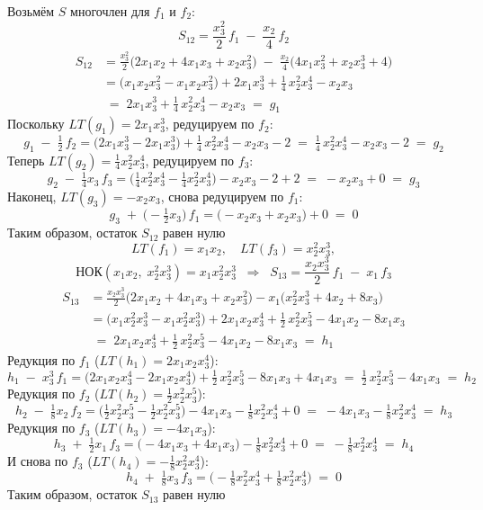 \documentclass[a4paper]{article}
\begin{document}
\begin{enumerate}
  Возьмём $S$ многочлен для $f_1$ и $f_2$:
  \[S_{12}
  =\frac{x_3^2}{2}\,f_1 \;-\;\frac{x_2}{4}\,f_2
  \]
  \[
  \begin{aligned}
  S_{12}
  &=\frac{x_3^2}{2}\bigl(2x_1x_2+4x_1x_3+x_2x_3^2\bigr)
  \;-\;\frac{x_2}{4}\bigl(4x_1x_3^2+x_2x_3^3+4\bigr)\\
  &=\bigl(x_1x_2x_3^2 - x_1x_2x_3^2\bigr)
  +2x_1x_3^3
  +\frac14\,x_2^2x_3^4
  - x_2x_3
  \\
  &\;=\;2x_1x_3^3 + \tfrac14\,x_2^2x_3^4 - x_2x_3
  \;=\;g_1
  \end{aligned}
  \]
  Поскольку \(LT(g_1)=2x_1x_3^3\), редуцируем по \(f_2\):
  \[
  g_1 \;-\;\tfrac12\,f_2
  =\bigl(2x_1x_3^3 -2x_1x_3^3\bigr)
  +\tfrac14\,x_2^2x_3^4
  - x_2x_3
  -2
  \;=\;\tfrac14\,x_2^2x_3^4 - x_2x_3 -2
  \;=\;g_2
  \]
  Теперь \(LT(g_2)=\tfrac14x_2^2x_3^4\), редуцируем по \(f_3\):
  \[
  g_2 \;-\;\tfrac{1}{4}x_3\,f_3
  =\bigl(\tfrac14x_2^2x_3^4 - \tfrac14x_2^2x_3^4\bigr)
  - x_2x_3
  -2
  +2
  \;=\;-x_2x_3 +0
  \;=\;g_3
  \]
  Наконец, \(LT(g_3)=-x_2x_3\), снова редуцируем по \(f_1\):
  \[
  g_3 \;+\; \bigl(-\tfrac12x_3\bigr)\,f_1
  = \bigl(-x_2x_3 + x_2x_3\bigr)
  +0
  \;=\;0
  \]
  Таким образом, остаток \(S_{12}\) равен нулю
  \[
  LT(f_1)=x_1x_2,\quad LT(f_3)=x_2^2x_3^3,
  \]
  \[
  \text{НОК}(x_1x_2,\;x_2^2x_3^3)=x_1x_2^2x_3^3
  \;\;\Longrightarrow\;\;
  S_{13}
  =\frac{x_2x_3^3}{2}\,f_1 \;-\;x_1\,f_3
  \]
  \[
  \begin{aligned}
  S_{13}
  &=\frac{x_2x_3^3}{2}\bigl(2x_1x_2+4x_1x_3+x_2x_3^2\bigr)
  - x_1\bigl(x_2^2x_3^3+4x_2+8x_3\bigr)\\
  &=\bigl(x_1x_2^2x_3^3 - x_1x_2^2x_3^3\bigr)
  +2x_1x_2x_3^4
  +\tfrac12\,x_2^2x_3^5
  -4x_1x_2
  -8x_1x_3
  \\
  &\;=\;2x_1x_2x_3^4 + \tfrac12\,x_2^2x_3^5 -4x_1x_2 -8x_1x_3
  \;=\;h_1
  \end{aligned}
  \]
  Редукция по \(f_1\) (\(LT(h_1)=2x_1x_2x_3^4\)):
  \[
  h_1 \;-\;x_3^3\,f_1
  =\bigl(2x_1x_2x_3^4 -2x_1x_2x_3^4\bigr)
  +\tfrac12\,x_2^2x_3^5
  -8x_1x_3
  +4x_1x_3
  \;=\;\tfrac12\,x_2^2x_3^5 -4x_1x_3
  \;=\;h_2
  \]
  Редукция по \(f_2\) (\(LT(h_2)=\tfrac12x_2^2x_3^5\)):
  \[
  h_2 \;-\;\tfrac{1}{8}x_2\,f_2
  =\bigl(\tfrac12x_2^2x_3^5 - \tfrac12x_2^2x_3^5\bigr)
  -4x_1x_3
  - \tfrac18x_2^2x_3^4
  +0
  \;=\;-4x_1x_3 - \tfrac18x_2^2x_3^4
  \;=\;h_3
  \]
  Редукция по \(f_3\) (\(LT(h_3)=-4x_1x_3\)):
  \[
  h_3 \;+\;\tfrac12x_1\,f_3
  =\bigl(-4x_1x_3 +4x_1x_3\bigr)
  - \tfrac18x_2^2x_3^4
  +0
  \;=\;- \tfrac18x_2^2x_3^4
  \;=\;h_4
  \]
  И снова по \(f_3\) (\(LT(h_4)=-\tfrac18x_2^2x_3^4\)):
  \[
  h_4 \;+\;\tfrac{1}{8}x_3\,f_3
  =\bigl(- \tfrac18x_2^2x_3^4 + \tfrac18x_2^2x_3^4\bigr)
  \;=\;0
  \]
  Таким образом, остаток \(S_{13}\) равен нулю


\end{enumerate}
\end{document}
